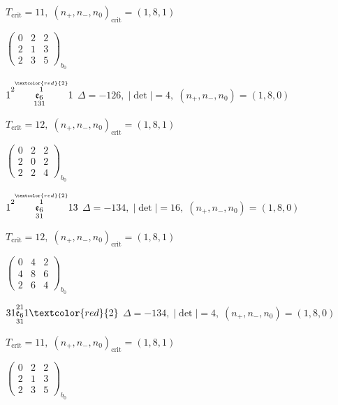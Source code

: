 \documentclass[10pt]{article}
\begin{document}
\hspace{1em}$T_{\text{crit}}=11,\; (n_+,n_-,n_0)_{\text{crit}}=(1,8,1)$

\hspace{2em}$\left(\begin{smallmatrix}0 & 2 & 2 \\ 2 & 1 & 3 \\ 2 & 3 & 5\end{smallmatrix}\right)_{\!b_0}$

\smallskip

$1\overset{2\overset{\textcolor{red}{2}}{1}}{\underset{131}{\mathfrak{e}_6}}1$ \quad $\Delta=-126,\; |\det|=4,\; (n_+,n_-,n_0)=(1,8,0)$

\hspace{1em}$T_{\text{crit}}=12,\; (n_+,n_-,n_0)_{\text{crit}}=(1,8,1)$

\hspace{2em}$\left(\begin{smallmatrix}0 & 2 & 2 \\ 2 & 0 & 2 \\ 2 & 2 & 4\end{smallmatrix}\right)_{\!b_0}$

\smallskip

$1\overset{2\overset{\textcolor{red}{2}}{1}}{\underset{31}{\mathfrak{e}_6}}13$ \quad $\Delta=-134,\; |\det|=16,\; (n_+,n_-,n_0)=(1,8,0)$

\hspace{1em}$T_{\text{crit}}=12,\; (n_+,n_-,n_0)_{\text{crit}}=(1,8,1)$

\hspace{2em}$\left(\begin{smallmatrix}0 & 4 & 2 \\ 4 & 8 & 6 \\ 2 & 6 & 4\end{smallmatrix}\right)_{\!b_0}$

$31\overset{21}{\underset{31}{\mathfrak{e}_6}}1\textcolor{red}{2}$ \quad $\Delta=-134,\; |\det|=4,\; (n_+,n_-,n_0)=(1,8,0)$

\hspace{1em}$T_{\text{crit}}=11,\; (n_+,n_-,n_0)_{\text{crit}}=(1,8,1)$

\hspace{2em}$\left(\begin{smallmatrix}0 & 2 & 2 \\ 2 & 1 & 3 \\ 2 & 3 & 5\end{smallmatrix}\right)_{\!b_0}$
\end{document}
